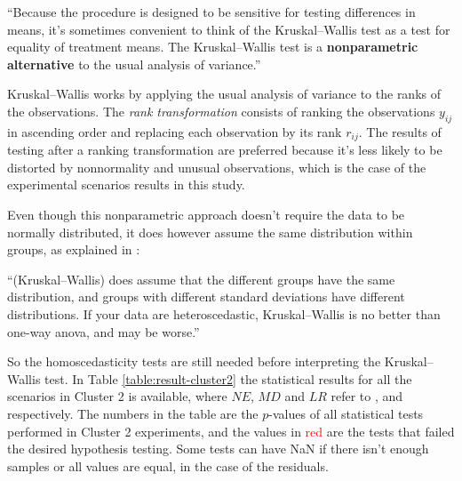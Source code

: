 \begin{displayquote}

``Because the procedure is designed to be sensitive for testing differences in means, it's sometimes convenient to think of the Kruskal–Wallis test as a test for equality of treatment means. The Kruskal–Wallis test is a \textbf{nonparametric alternative} to the usual analysis of variance.''

\end{displayquote}

Kruskal–Wallis works by applying the usual analysis of variance to the ranks of the observations. The \textit{rank transformation} consists of ranking the observations $y_{ij}$ in ascending order and replacing each observation by its rank $r_{ij}$. The results of testing after a ranking transformation are preferred because it's less likely to be distorted by nonnormality and unusual observations, which is the case of the experimental scenarios results in this study.

Even though this nonparametric approach doesn't require the data to be normally distributed, it does however assume the same distribution within groups, as explained in \cite{mcdonald2009handbook}:

\begin{displayquote}
    ``(Kruskal–Wallis) does assume that the different groups have the same distribution, and groups with different standard deviations have different distributions. If your data are heteroscedastic, Kruskal–Wallis is no better than one-way anova, and may be worse.''
\end{displayquote}

So the homoscedasticity tests are still needed before interpreting the Kruskal–Wallis test. In Table \ref{table:result-cluster2} the statistical results for all the scenarios in Cluster 2 is available, where $NE$, $MD$ and $LR$ refer to ,  and  respectively. The numbers in the table are the $p$-values of all statistical tests performed in Cluster 2 experiments, and the values in \textcolor{red}{red} are the tests that failed the desired hypothesis testing. Some tests can have NaN if there isn't enough samples or all values are equal, in the case of the residuals.

